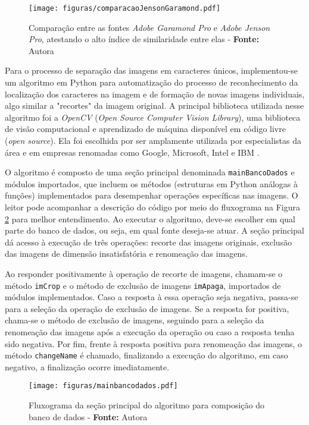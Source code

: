\begin{figure}[H]
  \centering
  \texttt{[image: figuras/comparacaoJensonGaramond.pdf]}
  \caption{Comparação entre as fontes \textit{Adobe Garamond Pro} e \textit{Adobe Jenson Pro}, atestando o alto índice de similaridade entre elas - \textbf{Fonte:} Autora}
  \label{fig:comparacaoJensonGaramond}
\end{figure}

Para o processo de separação das imagens em caracteres únicos, implementou-se um algoritmo em Python para automatização do processo de reconhecimento da localização dos caracteres na imagem e de formação de novas imagens individuais, algo similar a "recortes" {} da imagem original. A principal biblioteca utilizada nesse algoritmo foi a \textit{OpenCV} (\textit{Open Source Computer Vision Library}), uma biblioteca de visão computacional e aprendizado de máquina disponível em código livre (\textit{open source}). Ela foi escolhida por ser amplamente utilizada por especialistas da área e em empresas renomadas como Google, Microsoft, Intel e IBM .

O algoritmo é composto de uma seção principal denominada \texttt{mainBancoDados} e módulos importados, que incluem os métodos (estruturas em Python análogas à funções) implementados para desempenhar operações específicas nas imagens. O leitor pode acompanhar a descrição do código por meio do fluxograma na Figura \ref{fig:flowMain} para melhor entendimento. Ao executar o algoritmo, deve-se escolher em qual parte do banco de dados, ou seja, em qual fonte deseja-se atuar. A seção principal dá acesso à execução de três operações: recorte das imagens originais, exclusão das imagens de dimensão insatisfatória e renomeação das imagens.

Ao responder positivamente à operação de recorte de imagens, chamam-se o método \texttt{imCrop} e o método de exclusão de imagens \texttt{imApaga}, importados de módulos implementados. Caso a resposta à essa operação seja negativa, passa-se para a seleção da operação de exclusão de imagens. Se a resposta for positiva, chama-se o método de exclusão de imagens, seguindo para a seleção da renomeação das imagens após a execução da operação ou caso a resposta tenha sido negativa. Por fim, frente à resposta positiva para renomeação das imagens, o método \texttt{changeName} é chamado, finalizando a execução do algoritmo, em caso negativo, a finalização ocorre imediatamente.


\begin{figure}[H]
  \centering
  \texttt{[image: figuras/mainbancodados.pdf]}
  \caption{Fluxograma da seção principal do algoritmo para composição do banco de dados - \textbf{Fonte:} Autora}
  \label{fig:flowMain}
\end{figure}

